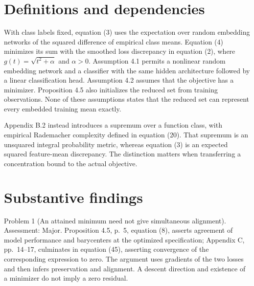 \documentclass[10pt]{article}
\begin{document}
\section*{Definitions and dependencies}
With class labels fixed, equation (3) uses the expectation over random embedding networks of the squared difference of empirical class means. Equation (4) minimizes its sum with the smoothed loss discrepancy in equation (2), where \(g(t)=\sqrt{t^2+\alpha}\) and \(\alpha>0\). Assumption 4.1 permits a nonlinear random embedding network and a classifier with the same hidden architecture followed by a linear classification head. Assumption 4.2 assumes that the objective has a minimizer. Proposition 4.5 also initializes the reduced set from training observations. None of these assumptions states that the reduced set can represent every embedded training mean exactly.\par
Appendix B.2 instead introduces a supremum over a function class, with empirical Rademacher complexity defined in equation (20). That supremum is an unsquared integral probability metric, whereas equation (3) is an expected squared feature-mean discrepancy. The distinction matters when transferring a concentration bound to the actual objective.\par
\section*{Substantive findings}
Problem 1 (An attained minimum need not give simultaneous alignment).  Assessment: Major. Proposition 4.5, p. 5, equation (8), asserts agreement of model performance and barycenters at the optimized specification; Appendix C, pp. 14–17, culminates in equation (45), asserting convergence of the corresponding expression to zero. The argument uses gradients of the two losses and then infers preservation and alignment. A descent direction and existence of a minimizer do not imply a zero residual.\par
\end{document}
